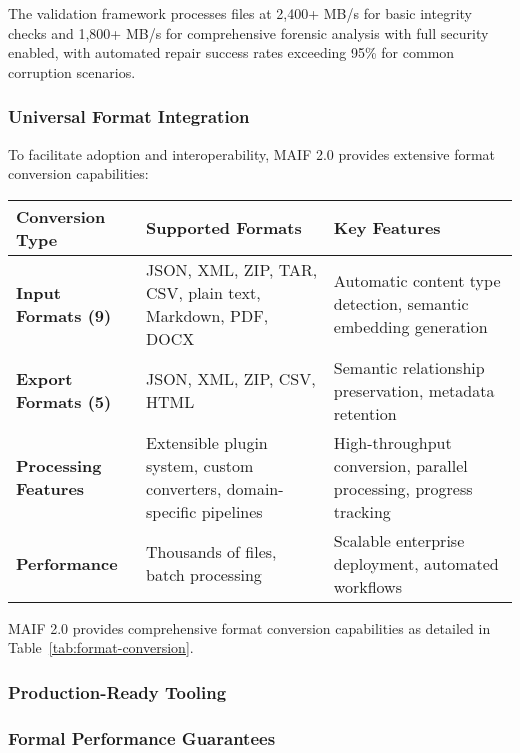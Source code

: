 \documentclass[conference]{IEEEtran}
\begin{document}
The validation framework processes files at 2,400+ MB/s for basic integrity checks and 1,800+ MB/s for comprehensive forensic analysis with full security enabled, with automated repair success rates exceeding 95\% for common corruption scenarios.

\subsubsection{Universal Format Integration}

To facilitate adoption and interoperability, MAIF 2.0 provides extensive format conversion capabilities:

\begin{table*}[!t]
\renewcommand{\arraystretch}{1.3}
\caption{MAIF Universal Format Conversion Capabilities}
\label{tab:format-conversion}
\centering
\footnotesize
\begin{tabular}{p{3cm}p{5cm}p{5cm}}
\toprule
\textbf{Conversion Type} & \textbf{Supported Formats} & \textbf{Key Features} \\
\midrule
\textbf{Input Formats (9)} & JSON, XML, ZIP, TAR, CSV, plain text, Markdown, PDF, DOCX & Automatic content type detection, semantic embedding generation \\
\textbf{Export Formats (5)} & JSON, XML, ZIP, CSV, HTML & Semantic relationship preservation, metadata retention \\
\textbf{Processing Features} & Extensible plugin system, custom converters, domain-specific pipelines & High-throughput conversion, parallel processing, progress tracking \\
\textbf{Performance} & Thousands of files, batch processing & Scalable enterprise deployment, automated workflows \\
\bottomrule
\end{tabular}
\end{table*}

MAIF 2.0 provides comprehensive format conversion capabilities as detailed in Table~\ref{tab:format-conversion}.

\subsubsection{Production-Ready Tooling}


\subsubsection{Formal Performance Guarantees}
\end{document}
